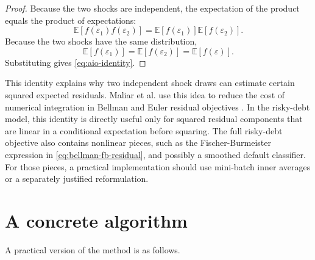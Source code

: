 \documentclass[11pt]{article}
\newcommand{\E}{\mathbb{E}}
\newcommand{\1}{\mathbf{1}}
\begin{document}
\begin{proof}
Because the two shocks are independent, the expectation of the product equals
the product of expectations:
\[
  \E[f(\varepsilon_1)f(\varepsilon_2)]
  =
  \E[f(\varepsilon_1)]\E[f(\varepsilon_2)].
\]
Because the two shocks have the same distribution,
\[
  \E[f(\varepsilon_1)]=\E[f(\varepsilon_2)]=\E[f(\varepsilon)].
\]
Substituting gives \cref{eq:aio-identity}.
\end{proof}

This identity explains why two independent shock draws can estimate certain
squared expected residuals. Maliar et al. use this idea to reduce the cost of
numerical integration in Bellman and Euler residual objectives
\citep[Definitions 2.9 and 2.10]{maliar2021deep}. In the risky-debt model, this
identity is directly useful only for squared residual components that are linear
in a conditional expectation before squaring. The full risky-debt objective also
contains nonlinear pieces, such as the Fischer-Burmeister expression in
\cref{eq:bellman-fb-residual}, and possibly a smoothed default classifier. For
those pieces, a practical implementation should use mini-batch inner averages or
a separately justified reformulation.

\section{A concrete algorithm}

A practical version of the method is as follows.
\end{document}
